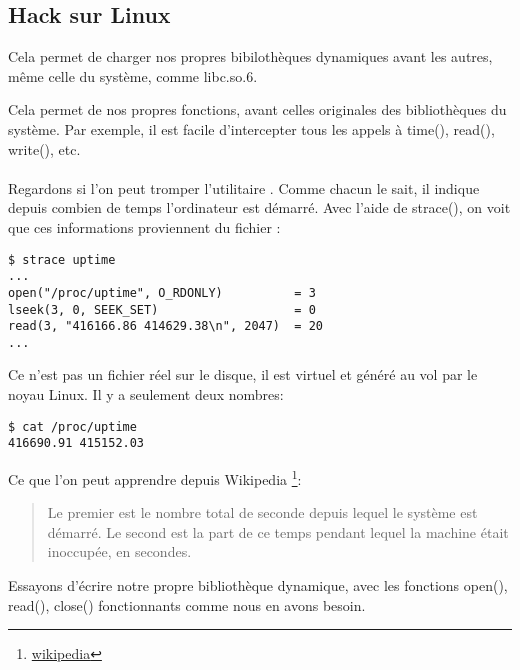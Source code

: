 \subsection{Hack  sur Linux}

\label{ld_preload}

Cela permet de charger nos propres bibilothèques dynamiques avant les autres, même celle du système, comme libc.so.6.

Cela permet de  nos propres fonctions, avant celles originales des bibliothèques du système.
Par exemple, il est facile d'intercepter tous les appels à
time(), read(), write(), etc. \\
\\
Regardons si l'on peut tromper l'utilitaire .
Comme chacun le sait, il indique depuis combien de temps l'ordinateur est démarré.
Avec l'aide de strace(), on voit que ces informations proviennent du fichier :

\begin{lstlisting}
$ strace uptime 
...
open("/proc/uptime", O_RDONLY)          = 3
lseek(3, 0, SEEK_SET)                   = 0
read(3, "416166.86 414629.38\n", 2047)  = 20
...
\end{lstlisting}

Ce n'est pas un fichier réel sur le disque, il est virtuel et généré au vol par le noyau Linux.
Il y a seulement deux nombres:

\begin{lstlisting}
$ cat /proc/uptime
416690.91 415152.03
\end{lstlisting}

Ce que l'on peut apprendre depuis Wikipedia
\footnote{\href{http://go.yurichev.com/17043}{wikipedia}}:

\begin{framed}
\begin{quotation}
Le premier est le nombre total de seconde depuis lequel le système est démarré.
Le second est la part de ce temps pendant lequel la machine était inoccupée, en secondes.
\end{quotation}
\end{framed}


Essayons d'écrire notre propre bibliothèque dynamique, avec les fonctions
open(), read(), close() fonctionnants comme nous en avons besoin.

